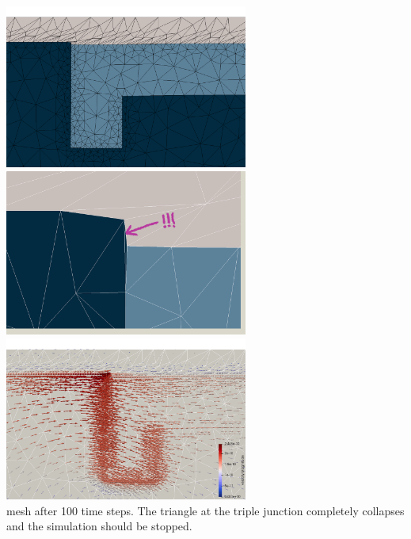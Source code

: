 \begin{center}
\includegraphics[width=8cm]{python_codes/fieldstone_93/results_exp6/mesh3}\\
\includegraphics[width=8cm]{python_codes/fieldstone_93/results_exp6/mesh4}
\includegraphics[width=8cm]{python_codes/fieldstone_93/results_exp6/mesh5}\\
{\captionfont mesh after 100 time steps. The triangle at the triple junction completely 
collapses and the simulation should be stopped.}
\end{center} 




